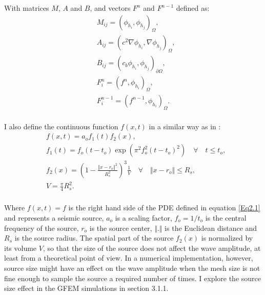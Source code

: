 With matrices $M$, $A$ and $B$, and vectors $F^n$ and $F^{n-1}$ defined as:
 \begin{equation} \label{Eq2.14}
 \begin{split}
  & M_{ij}=(\phi_{h_i},\phi_{h_j})_\Omega,\\
  & A_{ij}=(c^2 \nabla \phi_{h_i},\nabla \phi_{h_j})_\Omega,\\
  & B_{ij} =(c_b  \phi_{h_i}, \phi_{h_j})_{\partial \Omega },\\
  & F_i^n = (f^n, \phi_{h_i})_\Omega,\\
  & F_i^{n-1} = (f^{n-1}, \phi_{h_i})_\Omega.\\
 \end{split}
 \end{equation}

I also define the continuous function $f (x,t)$ in a similar way as in \cite{Yue2005}:
 \begin{equation} \label{Eq2.15}
 \begin{split}
  & f(x,t) = a_o f_1(t) f_2(x),\\
  &  f_1(t) = f_o (t-t_o) \exp \left( \pi^2 f_o^2 (t-t_o)^2   \right) \quad \forall \quad t \leq t_o,\\
  & f_2(x) =\left( 1- \frac{\Vert x - r_o \Vert ^2 }{R_s^2} \right)^3 \frac{1}{V} \quad \forall \quad \Vert x-r_o \Vert \leq R_s, \\ 
  & V =\frac{\pi}{4} R_s^2.\\
 \end{split}
 \end{equation}

Where $f(x,t) =f$ is the right hand side of the PDE defined in equation \ref{Eq2.1} and represents a seismic source,  $a_o$ is a scaling factor, $f_o = 1/t_o$ is the central frequency of the source, $r_o$ is the source center, $\Vert .\Vert$ is the Euclidean distance and $R_s$ is the source radius. The spatial part of the source $f_2(x)$ is normalized by its volume $V$, so that the size of the source does not affect the wave amplitude, at least from a theoretical point of view. In a numerical implementation, however, source size might have an effect on the wave amplitude when the mesh size is not fine enough to sample the source a required number of times. I explore the source size effect in the GFEM simulations in section 3.1.1.

